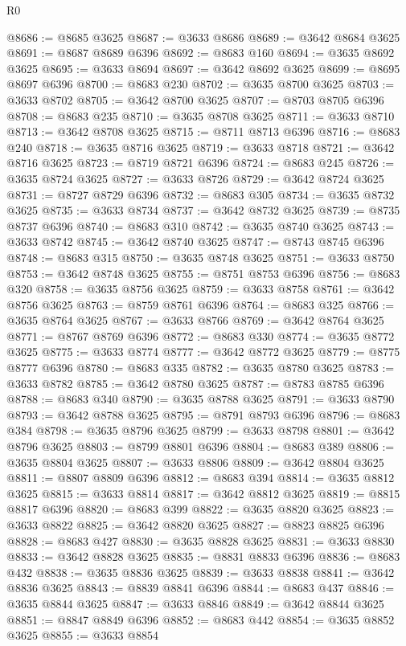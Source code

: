 \begin{lexlean}{R0}
\begin{coremodule}
@8686 := @8685 @3625
@8687 := @3633 @8686
@8689 := @3642 @8684 @3625
@8691 := @8687 @8689 @6396
@8692 := @8683 @160
@8694 := @3635 @8692 @3625
@8695 := @3633 @8694
@8697 := @3642 @8692 @3625
@8699 := @8695 @8697 @6396
@8700 := @8683 @230
@8702 := @3635 @8700 @3625
@8703 := @3633 @8702
@8705 := @3642 @8700 @3625
@8707 := @8703 @8705 @6396
@8708 := @8683 @235
@8710 := @3635 @8708 @3625
@8711 := @3633 @8710
@8713 := @3642 @8708 @3625
@8715 := @8711 @8713 @6396
@8716 := @8683 @240
@8718 := @3635 @8716 @3625
@8719 := @3633 @8718
@8721 := @3642 @8716 @3625
@8723 := @8719 @8721 @6396
@8724 := @8683 @245
@8726 := @3635 @8724 @3625
@8727 := @3633 @8726
@8729 := @3642 @8724 @3625
@8731 := @8727 @8729 @6396
@8732 := @8683 @305
@8734 := @3635 @8732 @3625
@8735 := @3633 @8734
@8737 := @3642 @8732 @3625
@8739 := @8735 @8737 @6396
@8740 := @8683 @310
@8742 := @3635 @8740 @3625
@8743 := @3633 @8742
@8745 := @3642 @8740 @3625
@8747 := @8743 @8745 @6396
@8748 := @8683 @315
@8750 := @3635 @8748 @3625
@8751 := @3633 @8750
@8753 := @3642 @8748 @3625
@8755 := @8751 @8753 @6396
@8756 := @8683 @320
@8758 := @3635 @8756 @3625
@8759 := @3633 @8758
@8761 := @3642 @8756 @3625
@8763 := @8759 @8761 @6396
@8764 := @8683 @325
@8766 := @3635 @8764 @3625
@8767 := @3633 @8766
@8769 := @3642 @8764 @3625
@8771 := @8767 @8769 @6396
@8772 := @8683 @330
@8774 := @3635 @8772 @3625
@8775 := @3633 @8774
@8777 := @3642 @8772 @3625
@8779 := @8775 @8777 @6396
@8780 := @8683 @335
@8782 := @3635 @8780 @3625
@8783 := @3633 @8782
@8785 := @3642 @8780 @3625
@8787 := @8783 @8785 @6396
@8788 := @8683 @340
@8790 := @3635 @8788 @3625
@8791 := @3633 @8790
@8793 := @3642 @8788 @3625
@8795 := @8791 @8793 @6396
@8796 := @8683 @384
@8798 := @3635 @8796 @3625
@8799 := @3633 @8798
@8801 := @3642 @8796 @3625
@8803 := @8799 @8801 @6396
@8804 := @8683 @389
@8806 := @3635 @8804 @3625
@8807 := @3633 @8806
@8809 := @3642 @8804 @3625
@8811 := @8807 @8809 @6396
@8812 := @8683 @394
@8814 := @3635 @8812 @3625
@8815 := @3633 @8814
@8817 := @3642 @8812 @3625
@8819 := @8815 @8817 @6396
@8820 := @8683 @399
@8822 := @3635 @8820 @3625
@8823 := @3633 @8822
@8825 := @3642 @8820 @3625
@8827 := @8823 @8825 @6396
@8828 := @8683 @427
@8830 := @3635 @8828 @3625
@8831 := @3633 @8830
@8833 := @3642 @8828 @3625
@8835 := @8831 @8833 @6396
@8836 := @8683 @432
@8838 := @3635 @8836 @3625
@8839 := @3633 @8838
@8841 := @3642 @8836 @3625
@8843 := @8839 @8841 @6396
@8844 := @8683 @437
@8846 := @3635 @8844 @3625
@8847 := @3633 @8846
@8849 := @3642 @8844 @3625
@8851 := @8847 @8849 @6396
@8852 := @8683 @442
@8854 := @3635 @8852 @3625
@8855 := @3633 @8854

\end{coremodule}
\end{lexlean}
